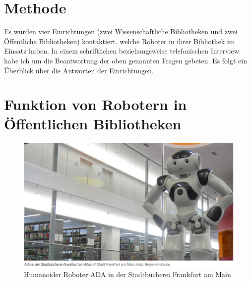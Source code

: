 \documentclass[a4paper,
fontsize=11pt,
oneside,
numbers=noperiodatend,
parskip=half-,
bibliography=totoc,
final
]{scrartcl}
\begin{document}
\hypertarget{methode}{%
\section{Methode}\label{methode}}

Es wurden vier Einrichtungen (zwei Wissenschaftliche Bibliotheken und
zwei Öffentliche Bibliotheken) kontaktiert, welche Roboter in ihrer
Bibliothek im Einsatz haben. In einem schriftlichen beziehungsweise
telefonischen Interview habe ich um die Beantwortung der oben genannten
Fragen gebeten. Es folgt ein Überblick über die Antworten der
Einrichtungen.

\hypertarget{funktion-von-robotern-in-uxf6ffentlichen-bibliotheken}{%
\section{Funktion von Robotern in Öffentlichen
Bibliotheken}\label{funktion-von-robotern-in-uxf6ffentlichen-bibliotheken}}

\begin{figure}
\centering
\includegraphics[width=.7\textwidth]{img/ADA.PNG}
\caption{Humanoider Roboter ADA in der Stadtbücherei Frankfurt am Main}
\end{figure}
\end{document}
